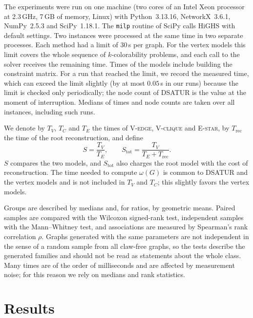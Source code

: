 \documentclass[11pt,a4paper]{article}
\newcommand{\Vedge}{\textsc{V-edge}}
\newcommand{\Vclique}{\textsc{V-clique}}
\newcommand{\Estar}{\textsc{E-star}}
\begin{document}
The experiments were run on one machine (two cores of an Intel Xeon processor
at 2.3\,GHz, 7\,GB of memory, Linux) with Python~3.13.16, NetworkX~3.6.1,
NumPy~2.5.3 and SciPy~1.18.1. The \texttt{milp} routine of SciPy calls HiGHS
with default settings. Two instances were processed at the same time in two
separate processes. Each method had a limit of $30$\,s per graph. For the
vertex models this limit covers the whole sequence of $k$-colorability
problems, and each call to the solver receives the remaining time. Times of
the models include building the constraint matrix. For a run that reached the
limit, we record the measured time, which can exceed the limit slightly
(by at most $0.05$\,s in our runs) because the limit is checked only
periodically; the node count of DSATUR is the value at the moment of
interruption. Medians of times and node counts are
taken over all instances, including such runs.

We denote by $T_V$, $T_C$ and $T_E$ the times of \Vedge, \Vclique{} and \Estar,
by $T_{\mathrm{rec}}$ the time of the root reconstruction, and define
\[
S=\frac{T_V}{T_E},\qquad S_{\mathrm{tot}}=\frac{T_V}{T_E+T_{\mathrm{rec}}} .
\]
$S$ compares the two models, and $S_{\mathrm{tot}}$ also charges the root model
with the cost of reconstruction. The time needed to compute $\omega(G)$ is
common to DSATUR and the vertex models and is not included in $T_V$ and $T_C$;
this slightly favors the vertex models.

Groups are described by medians and, for ratios, by geometric means. Paired
samples are compared with the Wilcoxon signed-rank test, independent samples
with the Mann--Whitney test, and associations are measured by Spearman's
rank correlation $\rho$. Graphs generated with the same parameters are not
independent in the sense of a random sample from all claw-free graphs, so the
tests describe the generated families and should not be read as statements
about the whole class. Many times are of the order of milliseconds and are
affected by measurement noise; for this reason we rely on medians and rank
statistics.

\section{Results}

\begin{table}[!htb]
\centering\small
\caption{Structural parameters (means unless stated otherwise). For set B the
chromatic number is taken from~\eqref{eq:matching}.}
\label{tab:params}

\end{table}
\end{document}
